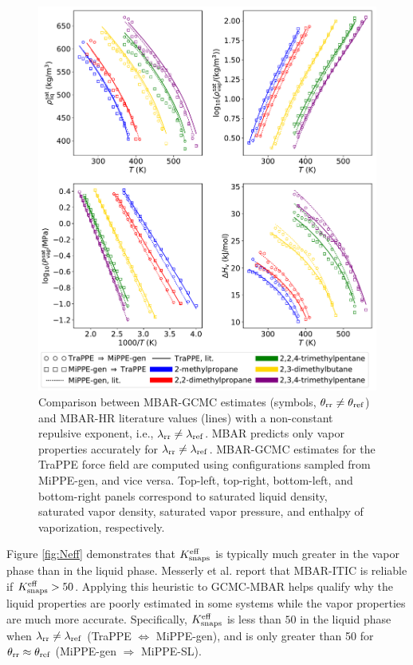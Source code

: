 \documentclass[journal=jced,manuscript=article]{achemso}
\begin{document}
	\begin{figure}[htb!]
		\centering
		\includegraphics[width=6.4in]{refFF_to_rrFF_lam_12to16.pdf}
		\caption{Comparison between MBAR-GCMC estimates (symbols, $\theta_{\rm rr} \neq \theta_{\rm ref}$) and MBAR-HR literature values (lines) with a non-constant repulsive exponent, i.e., $\lambda_{\rm rr} \neq \lambda_{\rm ref}$. MBAR predicts only vapor properties accurately for $\lambda_{\rm rr} \neq \lambda_{\rm ref}$. MBAR-GCMC estimates for the TraPPE force field are computed using configurations sampled from MiPPE-gen, and vice versa. Top-left, top-right, bottom-left, and bottom-right panels correspond to saturated liquid density, saturated vapor density, saturated vapor pressure, and enthalpy of vaporization, respectively.}
		\label{fig:refFF_to_rrFF_lam12to16}
	\end{figure}

Figure \ref{fig:Neff} demonstrates that $K_{\rm snaps}^{\rm eff}$ is typically much greater in the vapor phase than in the liquid phase. Messerly et al. report that MBAR-ITIC is reliable if $K_{\rm snaps}^{\rm eff} > 50$. Applying this heuristic to GCMC-MBAR helps qualify why the liquid properties are poorly estimated in some systems while the vapor properties are much more accurate. Specifically, $K_{\rm snaps}^{\rm eff}$ is less than $50$ in the liquid phase when $\lambda_{\rm rr} \neq \lambda_{\rm ref}$ (TraPPE $\Leftrightarrow$ MiPPE-gen), and is only greater than 50 for $\theta_{\rm rr} \approx \theta_{\rm ref}$ (MiPPE-gen $\Rightarrow$ MiPPE-SL).
\end{document}
